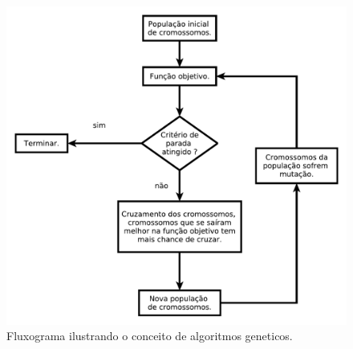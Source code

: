 \documentclass[10pt,a4paper]{article}
\begin{document}
\begin{figure}[H]
  \center
  \includegraphics[scale=0.6]{imgs/diagramaAG.pdf}            
  \caption{Fluxograma ilustrando o conceito de algoritmos geneticos.}
  \label{fig:MostrandoOCruzamentoUniforme}
\end{figure}
\end{document}
